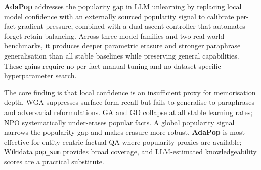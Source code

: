 \textbf{AdaPop} addresses the popularity gap in LLM unlearning by replacing local model confidence with an externally sourced popularity signal to calibrate per-fact gradient pressure, combined with a dual-ascent controller that automates forget-retain balancing. Across three model families and two real-world benchmarks, it produces deeper parametric erasure and stronger paraphrase generalisation than all stable baselines while preserving general capabilities. These gains require no per-fact manual tuning and no dataset-specific hyperparameter search.

The core finding is that local confidence is an insufficient proxy for memorisation depth. WGA suppresses surface-form recall but fails to generalise to paraphrases and adversarial reformulations. GA and GD collapse at all stable learning rates; NPO systematically under-erases popular facts. A global popularity signal narrows the popularity gap and makes erasure more robust. \textbf{AdaPop} is most effective for entity-centric factual QA where popularity proxies are available; Wikidata \texttt{pop\_sum} provides broad coverage, and LLM-estimated knowledgeability scores are a practical substitute.





